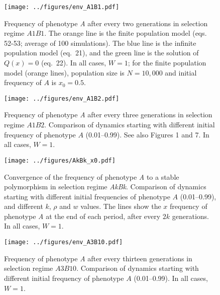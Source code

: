 \documentclass[]{article}
\newcommand{\beginsupplement}{%
	\setcounter{table}{0}
	\renewcommand{\thetable}{S\arabic{table}}%
	\setcounter{figure}{0}
	\renewcommand{\thefigure}{S\arabic{figure}}%
}
\begin{document}
\beginsupplement

\begin{figure}
\centering
\texttt{[image: ../figures/env\_A1B1.pdf]}
\caption{Frequency of phenotype \emph{A} after every two generations in
selection regime \(A1B1\). The orange line is the finite population model
(eqs. 52-53; average of 100 simulations). The blue line is the infinite population model
(eq.\ 21), and the green line is the  solution of \(Q(x)=0\) (eq.\ 22). In all cases, \(W=1\); for the finite population model (orange lines), population size is \(N=10,000\) and initial frequency of \(A\) is \(x_0=0.5\).}\label{fig:env_A1B1}
\end{figure}

\begin{figure}
\centering
\texttt{[image: ../figures/env\_A1B2.pdf]}
\caption{Frequency of phenotype \emph{A} after every three generations in
selection regime $A1B2$. Comparison of dynamics starting with
different initial frequency of phenotype \(A\) (0.01--0.99).
See also Figures 1 and  7. In all cases, $W=1$.}\label{fig:env_A1B2}
\end{figure}

\begin{figure}
\centering
\texttt{[image: ../figures/AkBk\_x0.pdf]}
\caption{Convergence of the frequency of phenotype \emph{A} to a stable polymorphism in selection regime \emph{AkBk}.
Comparison of dynamics starting with different initial frequencies of phenotype \(A\) (0.01--0.99), and different $k$, $\rho$ and $w$ values.
The lines show the $x$ frequency of phenotype \emph{A} at the end of each period, after every $2k$ generations.
In all cases, $W=1$.}\label{fig:AkBk_x0}
\end{figure}

\begin{figure}
\centering
\texttt{[image: ../figures/env\_A3B10.pdf]}
\caption{Frequency of phenotype \emph{A} after every thirteen generations in
selection regime $A3B10$. Comparison of dynamics starting with
different initial frequency of phenotype \(A\) (0.01--0.99).
In all cases, $W=1$.}\label{fig:env_A3B10}
\end{figure}
\end{document}
